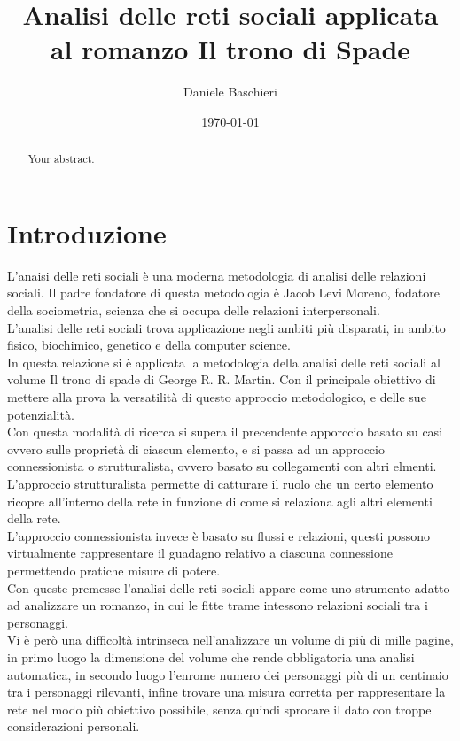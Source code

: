 \documentclass[a4paper]{article}
\title{Analisi delle reti sociali applicata al romanzo Il trono di Spade}
\author{Daniele Baschieri}
\date{\today}
\begin{document}
\maketitle

\begin{abstract}
Your abstract.
\end{abstract}

\section{Introduzione}
L'anaisi delle reti sociali è una moderna metodologia di analisi delle relazioni sociali. Il padre fondatore di questa metodologia è Jacob Levi Moreno, fodatore della sociometria, scienza che si occupa delle relazioni interpersonali.\\
L'analisi delle reti sociali trova applicazione negli ambiti più disparati, in ambito fisico, biochimico, genetico e della computer science.\\
In questa relazione si è applicata la metodologia della analisi delle reti sociali al volume Il trono di spade di George R. R. Martin. Con il principale obiettivo di mettere alla prova la versatilità di questo approccio metodologico, e delle sue potenzialità.\\ 

Con questa modalità di ricerca si supera il precendente apporccio basato su casi ovvero sulle proprietà di ciascun elemento, e si passa ad un approccio connessionista o strutturalista, ovvero basato su collegamenti con altri elmenti.\\
L'approccio strutturalista permette di catturare il ruolo che un certo elemento ricopre all'interno della rete in funzione di come si relaziona agli altri elementi della rete.\\
L'approccio connessionista invece è basato su flussi e relazioni, questi possono virtualmente rappresentare il guadagno relativo a ciascuna connessione permettendo pratiche misure di potere.\\
Con queste premesse l'analisi delle reti sociali appare come uno strumento adatto ad analizzare un romanzo, in cui le fitte trame intessono relazioni sociali tra i personaggi. \\
Vi è però una difficoltà intrinseca nell'analizzare un volume di più di mille pagine, in primo luogo la dimensione del volume che rende obbligatoria una analisi automatica, in secondo luogo l'enrome numero dei personaggi più di un centinaio tra i personaggi rilevanti, infine trovare una misura corretta per rappresentare la rete nel modo più obiettivo possibile, senza quindi sprocare il dato con troppe considerazioni personali.
\end{document}
